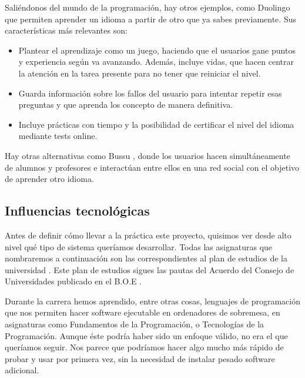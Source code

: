 Saliéndonos del mundo de la programación, hay otros ejemplos, como Duolingo \cite{duolingo} que permiten aprender un idioma a partir de otro que ya sabes previamente. Sus características más relevantes son:

\begin{itemize}
\item
Plantear el aprendizaje como un juego, haciendo que el usuarios gane puntos y experiencia según va avanzando. Además, incluye vidas, que hacen centrar la atención en la tarea presente para no tener que reiniciar el nivel.

\item
Guarda información sobre los fallos del usuario para intentar repetir esas preguntas y que aprenda los concepto de manera definitiva.

\item
Incluye prácticas con tiempo y la posibilidad de certificar el nivel del idioma mediante tests online.
\end{itemize}

Hay otras alternativas como Bussu \cite{bussu}, donde los usuarios hacen simultáneamente de alumnos y profesores e interactúan entre ellos en una red social con el objetivo de aprender otro idioma.

\subsection{Influencias tecnológicas\label{subsec:introduction}}

Antes de definir cómo llevar a la práctica este proyecto, quisimos ver desde alto nivel qué tipo de sistema queríamos desarrollar. Todas las asignaturas que nombraremos a continuación son las correspondientes al plan de estudios de la universidad \cite{plan}. Este plan de estudios sigues las pautas del Acuerdo del Consejo de Universidades publicado en el B.O.E \cite{boe}. 
\vspace{1em}

Durante la carrera hemos aprendido, entre otras cosas, lenguajes de programación que nos permiten hacer software ejecutable en ordenadores de sobremesa, en asignaturas como Fundamentos de la Programación, o Tecnologías de la Programación. Aunque éste podría haber sido un enfoque válido, no era el que queríamos seguir. Nos parece que podríamos hacer algo mucho más rápido de probar y usar por primera vez, sin la necesidad de instalar pesado software adicional.
\vspace{1em}

